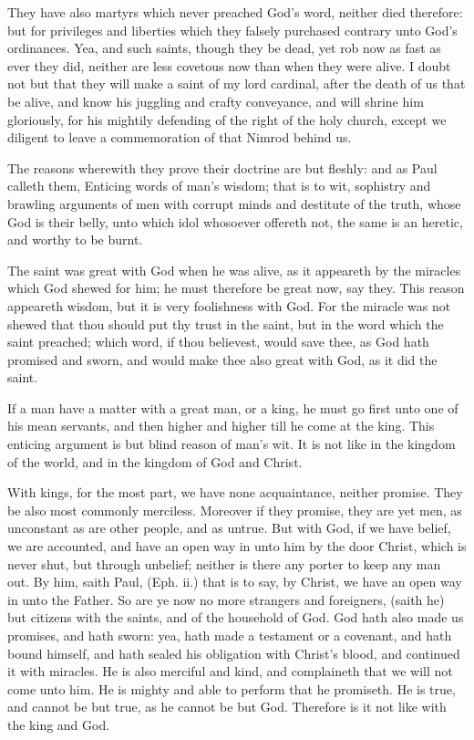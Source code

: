 They have also martyrs which never preached God's
word, neither died therefore: but for privileges and liberties
which they falsely purchased contrary unto God's ordinances.
Yea, and such saints, though they be dead,
yet rob now as fast as ever they did, neither are less covetous
now than when they were alive. I doubt not but that
they will make a saint of my lord cardinal, after the death
of us that be alive, and know his juggling and crafty conveyance,
and will shrine him gloriously, for his mightily
defending of the right of the holy church, except we
diligent to leave a commemoration of that Nimrod behind
us. 

The reasons wherewith they prove their doctrine are
but fleshly: and as Paul calleth them, Enticing words of
man's wisdom; that is to wit, sophistry and brawling arguments
of men with corrupt minds and destitute of the truth,
whose God is their belly, unto which idol whosoever offereth
not, the same is an heretic, and worthy to be burnt. 

The saint was great with God when he was alive, as it 
appeareth by the miracles which God shewed for him; he 
must therefore be great now, say they. This reason appeareth
wisdom, but it is very foolishness with God. For 
the miracle was not shewed that thou should put thy trust
in the saint, but in the word which the saint preached; 
which word, if thou believest, would save thee, as God 
hath promised and sworn, and would make thee also great 
with God, as it did the saint. 

If a man have a matter with a great man, or a king, he 
must go first unto one of his mean servants, and then higher 
and higher till he come at the king. This enticing argument 
is but blind reason of man's wit. It is not like in the
kingdom of the world, and in the kingdom of God and 
Christ. 

With kings, for the most part, we have none acquaintance,
neither promise. They be also most commonly 
merciless. Moreover if they promise, they are yet men, 
as unconstant as are other people, and as untrue. But 
with God, if we have belief, we are accounted, and have 
an open way in unto him by the door Christ, which is 
never shut, but through unbelief; neither is there any porter
to keep any man out. By him, saith Paul, (Eph. ii.)
that is to say, by Christ, we have an open way in unto the 
Father. So are ye now no more strangers and foreigners,
(saith he) but citizens with the saints, and of the household
of God. God hath also made us promises, and hath 
sworn: yea, hath made a testament or a covenant, and hath 
bound himself, and hath sealed his obligation with Christ's 
blood, and continued it with miracles. He is also merciful
and kind, and complaineth that we will not come unto 
him. He is mighty and able to perform that he promiseth.
He is true, and cannot be but true, as he cannot be but
God. Therefore is it not like with the king and God. 

